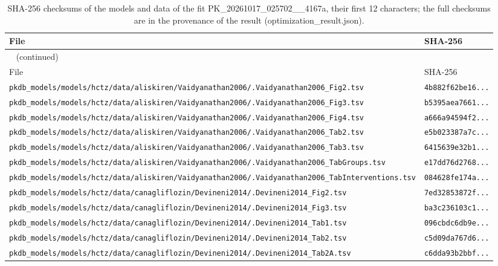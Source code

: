 \begin{longtable}{ll}
\caption{SHA-256 checksums of the models and data of the fit PK\_20261017\_025702\_\_4167a, their first 12 characters; the full checksums are in the provenance of the result (optimization\_result.json).}\label{tab:checksums:PK_20261017_025702__4167a} \\
\toprule
File & SHA-256 \\
\midrule
\endfirsthead
\multicolumn{2}{l}{\small\tablename~\thetable{} (continued)} \\
\toprule
File & SHA-256 \\
\midrule
\endhead
\bottomrule
\endlastfoot
\texttt{pkdb\_models/models/hctz/data/aliskiren/Vaidyanathan2006/.Vaidyanathan2006\_Fig2.tsv} & \texttt{4b882f62be16...} \\
\texttt{pkdb\_models/models/hctz/data/aliskiren/Vaidyanathan2006/.Vaidyanathan2006\_Fig3.tsv} & \texttt{b5395aea7661...} \\
\texttt{pkdb\_models/models/hctz/data/aliskiren/Vaidyanathan2006/.Vaidyanathan2006\_Fig4.tsv} & \texttt{a666a94594f2...} \\
\texttt{pkdb\_models/models/hctz/data/aliskiren/Vaidyanathan2006/.Vaidyanathan2006\_Tab2.tsv} & \texttt{e5b023387a7c...} \\
\texttt{pkdb\_models/models/hctz/data/aliskiren/Vaidyanathan2006/.Vaidyanathan2006\_Tab3.tsv} & \texttt{6415639e32b1...} \\
\texttt{pkdb\_models/models/hctz/data/aliskiren/Vaidyanathan2006/.Vaidyanathan2006\_TabGroups.tsv} & \texttt{e17dd76d2768...} \\
\texttt{pkdb\_models/models/hctz/data/aliskiren/Vaidyanathan2006/.Vaidyanathan2006\_TabInterventions.tsv} & \texttt{084628fe174a...} \\
\texttt{pkdb\_models/models/hctz/data/canagliflozin/Devineni2014/.Devineni2014\_Fig2.tsv} & \texttt{7ed32853872f...} \\
\texttt{pkdb\_models/models/hctz/data/canagliflozin/Devineni2014/.Devineni2014\_Fig3.tsv} & \texttt{ba3c236103c1...} \\
\texttt{pkdb\_models/models/hctz/data/canagliflozin/Devineni2014/.Devineni2014\_Tab1.tsv} & \texttt{096cbdc6db9e...} \\
\texttt{pkdb\_models/models/hctz/data/canagliflozin/Devineni2014/.Devineni2014\_Tab2.tsv} & \texttt{c5d09da767d6...} \\
\texttt{pkdb\_models/models/hctz/data/canagliflozin/Devineni2014/.Devineni2014\_Tab2A.tsv} & \texttt{c6dda93b2bbf...} \\

\end{longtable}
